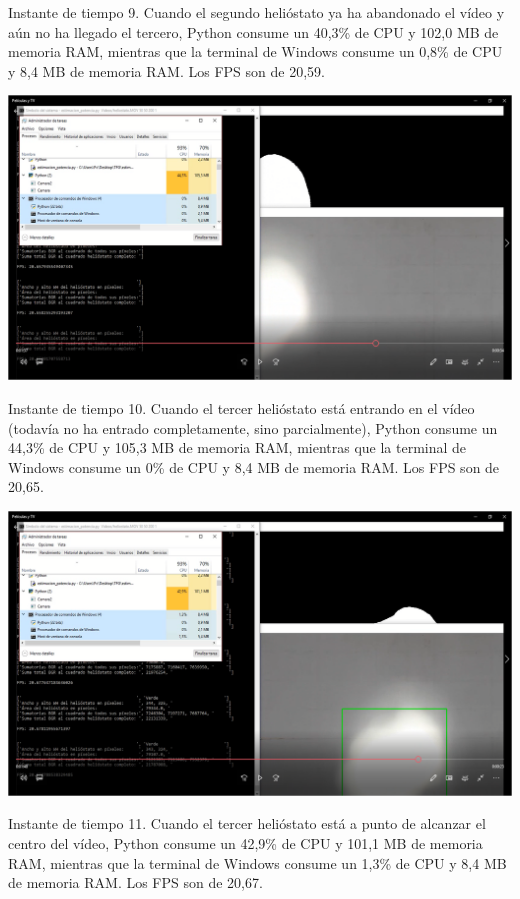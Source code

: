 \documentclass[12pt]{article}
\begin{document}
Instante de tiempo 9. Cuando el segundo helióstato ya ha abandonado el vídeo y aún no ha llegado el tercero, Python consume un 40,3\% de CPU y 102,0 MB de memoria RAM, mientras que la terminal de Windows consume un 0,8\% de CPU y 8,4 MB de memoria RAM. Los FPS son de 20,59.


\includegraphics[width=\textwidth]{CapturasRendimientoSoftware2/Imagen10.png}

Instante de tiempo 10. Cuando el tercer helióstato está entrando en el vídeo (todavía no ha entrado completamente, sino parcialmente), Python consume un 44,3\% de CPU y 105,3 MB de memoria RAM, mientras que la terminal de Windows consume un 0\% de CPU y 8,4 MB de memoria RAM. Los FPS son de 20,65.


\includegraphics[width=\textwidth]{CapturasRendimientoSoftware2/Imagen11.png}

Instante de tiempo 11. Cuando el tercer helióstato está a punto de alcanzar el centro del vídeo, Python consume un 42,9\% de CPU y 101,1 MB de memoria RAM, mientras que la terminal de Windows consume un 1,3\% de CPU y 8,4 MB de memoria RAM. Los FPS son de 20,67.
\end{document}
